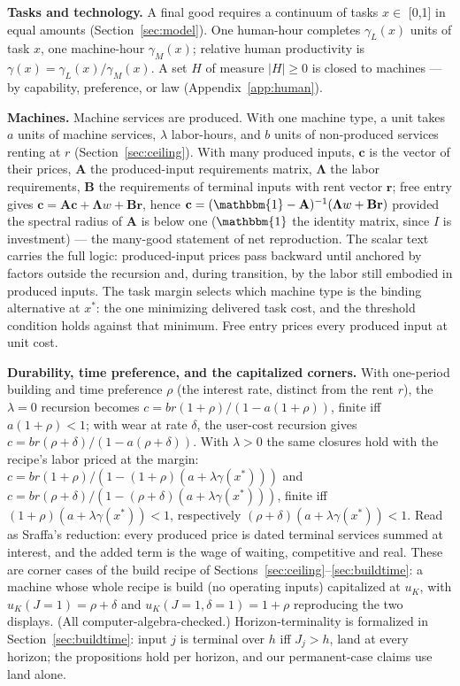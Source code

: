 \documentclass[12pt]{article}
\theoremstyle{plain}
\begin{document}
\textbf{Tasks and technology.} A final good requires a continuum of tasks $x \in$ [0,1] in equal amounts (Section~\ref{sec:model}). One human-hour completes $\gamma _L(x)$ units of task $x$, one machine-hour $\gamma _M(x)$; relative human productivity is $\gamma (x) = \gamma _L(x)/\gamma _M(x)$. A set $H$ of measure $|H| \ge 0$ is closed to machines --- by capability, preference, or law (Appendix~\ref{app:human}).

\textbf{Machines.} Machine services are produced. With one machine type, a unit takes $a$ units of machine services, $\lambda$ labor-hours, and $b$ units of non-produced services renting at $r$ (Section~\ref{sec:ceiling}). With many produced inputs, $\mathbf{c}$ is the vector of their prices, $\mathbf{A}$ the produced-input requirements matrix, $\boldsymbol{\Lambda}$ the labor requirements, $\mathbf{B}$ the requirements of terminal inputs with rent vector $\mathbf{r}$; free entry gives $\mathbf{c} = \mathbf{A}\mathbf{c} + \boldsymbol{\Lambda}w + \mathbf{B}\mathbf{r}$, hence $\mathbf{c} = (\mathbbm{1}-\mathbf{A})^{-1}(\boldsymbol{\Lambda}w + \mathbf{B}\mathbf{r})$ provided the spectral radius of $\mathbf{A}$ is below one ($\mathbbm{1}$ the identity matrix, since $I$ is investment) --- the many-good statement of net reproduction. The scalar text carries the full logic: produced-input prices pass backward until anchored by factors outside the recursion and, during transition, by the labor still embodied in produced inputs. The task margin selects which machine type is the binding alternative at $x^*$: the one minimizing delivered task cost, and the threshold condition holds against that minimum. Free entry prices every produced input at unit cost.

\textbf{Durability, time preference, and the capitalized corners.} With one-period building and time preference $\rho$ (the interest rate, distinct from the rent $r$), the $\lambda = 0$ recursion becomes $c = br(1+\rho )/(1 - a(1+\rho ))$, finite iff $a(1+\rho ) < 1$; with wear at rate $\delta$, the user-cost recursion gives $c = br(\rho +\delta )/(1 - a(\rho +\delta ))$. With $\lambda > 0$ the same closures hold with the recipe's labor priced at the margin: $c = br(1+\rho )/(1 - (1+\rho )(a + \lambda \gamma (x^*)))$ and $c = br(\rho +\delta )/(1 - (\rho +\delta )(a + \lambda \gamma (x^*)))$, finite iff $(1+\rho )(a + \lambda \gamma (x^*)) < 1$, respectively $(\rho +\delta )(a + \lambda \gamma (x^*)) < 1$. Read as Sraffa's reduction: every produced price is dated terminal services summed at interest, and the added term is the wage of waiting, competitive and real. These are corner cases of the build recipe of Sections~\ref{sec:ceiling}--\ref{sec:buildtime}: a machine whose whole recipe is build (no operating inputs) capitalized at $u_K$, with $u_K(J=1) = \rho +\delta$ and $u_K(J=1, \delta =1) = 1+\rho$ reproducing the two displays. (All computer-algebra-checked.) Horizon-terminality is formalized in Section~\ref{sec:buildtime}: input $j$ is terminal over $h$ iff $J_j > h$, land at every horizon; the propositions hold per horizon, and our permanent-case claims use land alone.
\end{document}
